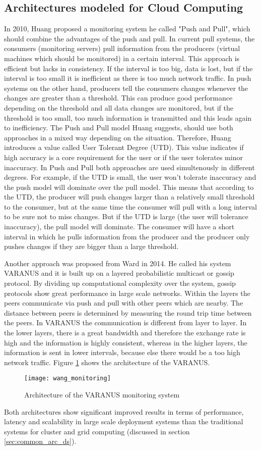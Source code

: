 \subsection{Architectures modeled for Cloud Computing}
In 2010, Huang \cite{He_2010} proposed a monitoring system he called "Push and Pull", which should combine the advantages of the push and pull. In current pull systems, the consumers (monitoring servers) pull information from the producers (virtual machines which should be monitored) in a certain interval. This approach is efficient but lacks in consistency. If the interval is too big, data is lost, but if the interval is too small it is inefficient as there is too much network traffic. In push systems on the other hand, producers tell the consumers changes whenever the changes are greater than a threshold. This can produce good performance depending on the threshold and all data changes are monitored, but if the threshold is too small, too much information is transmitted and this leads again to inefficiency. The Push and Pull model Huang suggests, should use both approaches in a mixed way depending on the situation. Therefore, Huang introduces a value called User Tolerant Degree (UTD). This value indicates if high accuracy is a core requirement for the user or if the user tolerates minor inaccuracy. In Push and Pull both approaches are used simultenously in different degrees. For example, if the UTD is small, the user won't tolerate inaccuracy and the push model will dominate over the pull model. This means that according to the UTD, the producer will push changes larger than a relatively small threshold to the consumer, but at the same time the consumer will pull with a long interval to be sure not to miss changes. But if the UTD is large (the user will tolerance inaccuracy), the pull model will dominate. The consumer will have a short interval in which he pulls information from the producer and the producer only pushes changes if they are bigger than a large threshold.

Another approach was proposed from Ward \cite{Ward_2014} in 2014. He called his system VARANUS and it is built up on a layered probabilistic multicast or gossip protocol. By dividing up computational complexity over the system, gossip protocols show great performance in large scale networks. Within the layers the peers communicate via push and pull with other peers which are nearby. The distance between peers is determined by measuring the round trip time between the peers. In VARANUS the communication is different from layer to layer. In the lower layers, there is a great bandwidth and therefore the exchange rate is high and the information is highly consistent, whereas in the higher layers, the information is sent in lower intervals, because else there would be a too high network traffic.
Figure \ref{fig:ward_varnus_architecture} shows the architecture of the VARANUS.
\begin{figure}
	\centering
		\texttt{[image: wang\_monitoring]}
	\caption{Architecture of the VARANUS monitoring system \cite{Ward_2014}}
	\label{fig:ward_varnus_architecture}
\end{figure}

Both architectures show significant improved results in terms of performance, latency and scalability in large scale deployment systems than the traditional systems for cluster and grid computing (discussed in section \ref{sec:common_arc_ds}).
